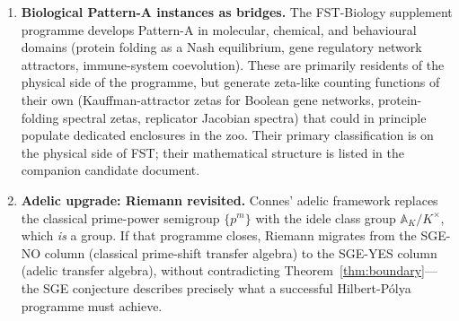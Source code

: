 \documentclass[11pt]{article}
\theoremstyle{definition}
\theoremstyle{remark}
\begin{document}
\begin{enumerate}
\begin{itemize}
  via gravitational-wave ringdown observations (LIGO/Virgo/Einstein
  Telescope).
  \item \textbf{Yang-Lee zeros}:\\[-0.6ex]
  ferromagnetic partition functions;
  conjecturally flow-noncompact, \textbf{SGE-YES}. Temperature as
  continuous parameter; the Lee-Yang circle theorem plays the role
  of an RH-analog. Statistical-mechanical cousin of CRM.
  \item \textbf{Bost-Connes system} (1995): a quantum-statistical
  realisation of $\zeta(s)$ as partition function with spontaneous
  symmetry breaking at $\beta = 1$. Sits on the bridge between the
  arithmetic and flow classes and connects the zoo directly to
  Connes' adelic framework \cite{BostConnes1995,Connes1999, Connes2026}.
  \end{itemize}
  Each of these deserves a dedicated FST-Mathematics supplement in
  due course. A second tier of twelve further constructions
  (Epstein, Witten-zeta, multiple-zeta-values, Hurwitz, Lerch,
  Arakelov, motivic $L$, chiral-zeta, RG-zetas, Gromov-Witten,
  Reidemeister torsion, QFT spectral zetas) and a separate column
  of biological Pattern-A-derived zetas (Kauffman-attractor,
  protein-folding spectral, replicator Jacobian) are catalogued in
  the companion tree document \cite{CandidatesMasterList}.

\item \textbf{Biological Pattern-A instances as bridges.} The
  FST-Biology supplement programme \cite{FSTBiology} develops
  Pattern-A in molecular, chemical, and behavioural domains
  (protein folding as a Nash equilibrium, gene regulatory network
  attractors, immune-system coevolution). These are primarily
  residents of the physical side of the programme, but generate
  zeta-like counting functions of their own (Kauffman-attractor
  zetas for Boolean gene networks, protein-folding spectral zetas,
  replicator Jacobian spectra) that could in principle populate
  dedicated enclosures in the zoo. Their primary classification
  is on the physical side of FST; their mathematical structure is
  listed in the companion candidate document.

\item \textbf{Adelic upgrade: Riemann revisited.} Connes' adelic
  framework \cite{Connes1999, Connes2026} replaces the classical
  prime-power semigroup $\{p^m\}$ with the idele class group
  $\mathbb{A}_K/K^\times$, which \emph{is} a group. If that
  programme closes, Riemann migrates from the SGE-NO column
  (classical prime-shift transfer algebra) to the SGE-YES column
  (adelic transfer algebra), without contradicting
  Theorem~\ref{thm:boundary}---the SGE conjecture describes
  precisely what a successful Hilbert-P\'olya programme must
  achieve.


\end{enumerate}
\end{document}
